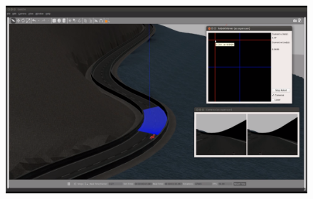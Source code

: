 \documentclass[notes,slidesec,a4]{seminar}
\begin{document}
\begin{hslide}
	\begin{center}
		\begin{figure}
			\includegraphics[width=\textwidth]{monacocorriendo.png}
		\end{figure}
	\end{center}
\end{hslide}
\end{document}
